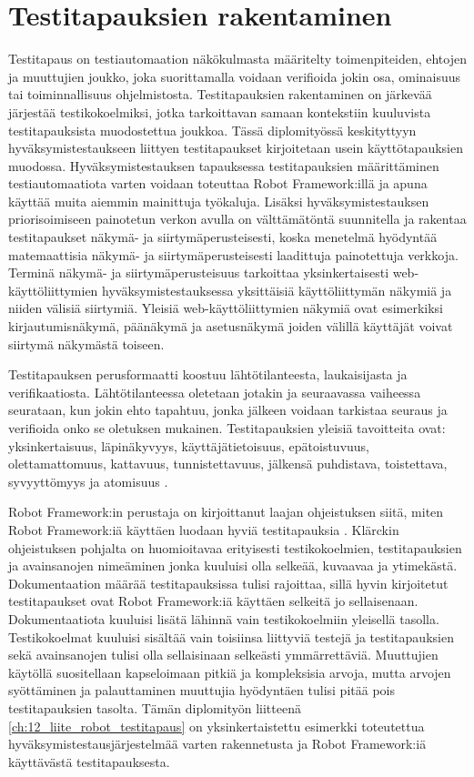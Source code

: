 \section{Testitapauksien rakentaminen} \label{ch:08_testitapauksien_rakentaminen}

  Testitapaus on testiautomaation näkökulmasta määritelty toimenpiteiden, ehtojen ja muuttujien joukko, joka suorittamalla voidaan verifioida jokin osa, ominaisuus tai toiminnallisuus ohjelmistosta.
  Testitapauksien rakentaminen on järkevää järjestää testikokoelmiksi, jotka tarkoittavan samaan kontekstiin kuuluvista testitapauksista muodostettua joukkoa.
  Tässä diplomityössä keskityttyyn hyväksymistestaukseen liittyen testitapaukset kirjoitetaan usein käyttötapauksien muodossa.
  Hyväksymistestauksen tapauksessa testitapauksien määrittäminen testiautomaatiota varten voidaan toteuttaa Robot Framework:illä ja apuna käyttää muita aiemmin mainittuja työkaluja.
  Lisäksi hyväksymistestauksen priorisoimiseen painotetun verkon avulla on välttämätöntä suunnitella ja rakentaa testitapaukset näkymä- ja siirtymäperusteisesti, koska menetelmä hyödyntää matemaattisia näkymä- ja siirtymäperusteisesti laadittuja painotettuja verkkoja.
  Terminä näkymä- ja siirtymäperusteisuus tarkoittaa yksinkertaisesti web-käyttöliittymien hyväksymistestauksessa yksittäisiä käyttöliittymän näkymiä ja niiden välisiä siirtymiä.
  Yleisiä web-käyttöliittymien näkymiä ovat esimerkiksi kirjautumisnäkymä, päänäkymä ja asetusnäkymä joiden välillä käyttäjät voivat siirtymä näkymästä toiseen.

  Testitapauksen perusformaatti koostuu lähtötilanteesta, laukaisijasta ja verifikaatiosta.
  Lähtötilanteessa oletetaan jotakin ja seuraavassa vaiheessa seurataan, kun jokin ehto tapahtuu, jonka jälkeen voidaan tarkistaa seuraus ja verifioida onko se oletuksen mukainen.
  Testitapauksien yleisiä tavoitteita ovat: yksinkertaisuus, läpinäkyvyys, käyttäjätietoisuus, epätoistuvuus, olettamattomuus, kattavuus, tunnistettavuus, jälkensä puhdistava, toistettava, syvyyttömyys ja atomisuus \parencite{test_case_goals}.

  Robot Framework:in perustaja on kirjoittanut laajan ohjeistuksen siitä, miten Robot Framework:iä käyttäen luodaan hyviä testitapauksia \parencite{robot_framework_good_test_cases}.
  Klärckin ohjeistuksen pohjalta on huomioitavaa erityisesti testikokoelmien, testitapauksien ja avainsanojen nimeäminen jonka kuuluisi olla selkeää, kuvaavaa ja ytimekästä.
  Dokumentaation määrää testitapauksissa tulisi rajoittaa, sillä hyvin kirjoitetut testitapaukset ovat Robot Framework:iä käyttäen selkeitä jo sellaisenaan.
  Dokumentaatiota kuuluisi lisätä lähinnä vain testikokoelmiin yleisellä tasolla.
  Testikokoelmat kuuluisi sisältää vain toisiinsa liittyviä testejä ja testitapauksien sekä avainsanojen tulisi olla sellaisinaan selkeästi ymmärrettäviä.
  Muuttujien käytöllä suositellaan kapseloimaan pitkiä ja kompleksisia arvoja, mutta arvojen syöttäminen ja palauttaminen muuttujia hyödyntäen tulisi pitää pois testitapauksien tasolta.
  Tämän diplomityön liitteenä \ref{ch:12_liite_robot_testitapaus} on yksinkertaistettu esimerkki toteutettua hyväksymistestausjärjestelmää varten rakennetusta ja Robot Framework:iä käyttävästä testitapauksesta.

